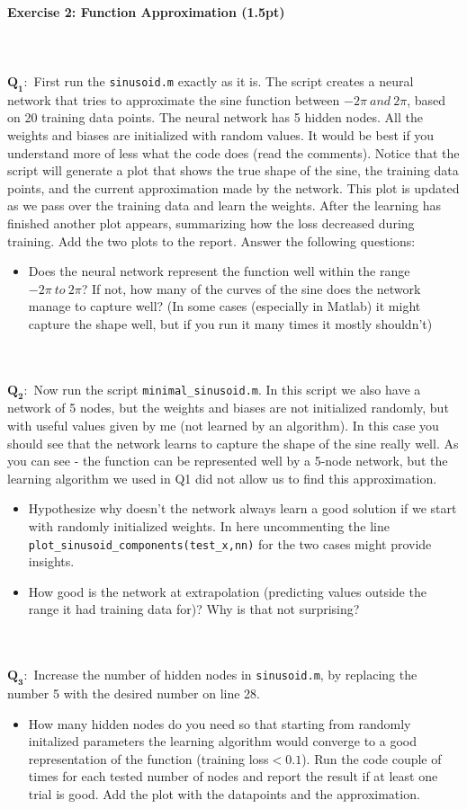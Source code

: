 \documentclass[a4paper,11pt]{article}
\newenvironment{exercise}[3]{\paragraph{Exercise #1: #2 (#3pt)}\ \\}{
\medskip}
\newcommand{\question}[2]{\setlength\parindent{0mm}\ \\$\mathbf{Q_#1:}$ #2\ \\}
\begin{document}
\begin{exercise}{2}{Function Approximation}{1.5}
\question{1}{First run the \texttt{sinusoid.m} exactly as it is. The script creates a neural network that tries to approximate the sine function between $-2\pi\ and\ 2\pi$, based on 20 training data points. The neural network has 5 hidden nodes. All the weights and biases are initialized with random values. It would be best if you understand more of less what the code does (read the comments).
Notice that the script will generate a plot that shows the true shape of the sine, the training data points, and the current approximation made by the network. This plot is updated as we pass over the training data and learn the weights. After the learning has finished another plot appears, summarizing how the loss decreased during training. Add the two plots to the report. Answer the following questions:
\begin{itemize}
\item Does the neural network represent the function well within the range $-2\pi\ to\ 2\pi$? If not, how many of the curves of the sine does the network manage to capture well? (In some cases (especially in Matlab) it might capture the shape well, but if you run it many times it mostly shouldn't) 
\end{itemize}
}
\question{2}{Now run the script \texttt{minimal\_sinusoid.m}. In this script we also have a network of 5 nodes, but the weights and biases are not initialized randomly, but with useful values given by me (not learned by an algorithm). In this case you should see that the network learns to capture the shape of the sine really well. As you can see - the function can be represented well by a 5-node network, but the learning algorithm we used in Q1 did not allow us to find this approximation. 
\begin{itemize}
\item Hypothesize why doesn't the network always learn a good solution if we start with randomly initialized weights. In here uncommenting the line  \texttt{plot\_sinusoid\_components(test\_x,nn)} for the  two cases might provide insights.
\item How good is the network at extrapolation (predicting values outside the range it had training data for)? Why is that not surprising? 
\end{itemize}
}
\question{3}{Increase the number of hidden nodes in \texttt{sinusoid.m}, by replacing the number 5 with the desired number on line 28. 
\begin{itemize}
\item How many hidden nodes do you need so that starting from randomly initalized parameters the learning algorithm would converge to a good representation of the function (training loss$<0.1$). Run the code couple of times for each tested number of nodes and report the result if at least one trial is good. Add the plot with the datapoints and the approximation.
\end{itemize}
}
\end{exercise}
\end{document}
